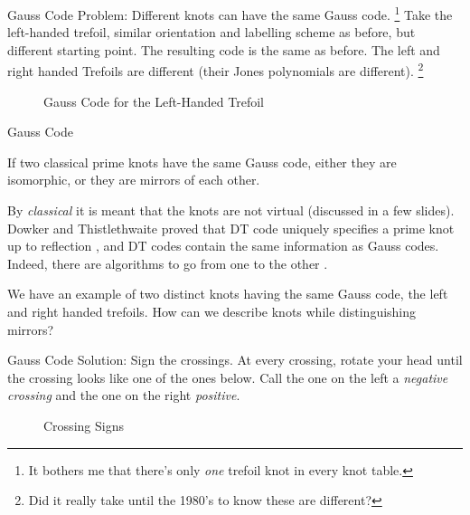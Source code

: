 \documentclass{beamer}
\begin{document}
    \begin{frame}{Gauss Code}
        Problem: Different knots can have the same Gauss code.%
        \footnote{%
            It bothers me that there's only \textit{one} trefoil knot in every
            knot table.
        }
        Take the left-handed trefoil, similar orientation and labelling scheme
        as before, but different starting point. The resulting code is the same
        as before. The left and right handed Trefoils are different
        (their Jones polynomials are different).%
        \footnote{
            Did it really take until the 1980's to know these are different?
        }
        \begin{figure}
            \centering
            \caption{Gauss Code for the Left-Handed Trefoil}
            \label{fig:left_handed_trefoil_gauss_code}
        \end{figure}
    \end{frame}
    \begin{frame}{Gauss Code}
        \begin{theorem}
            If two classical prime knots have the same Gauss code, either they
            are isomorphic, or they are mirrors of each other.
        \end{theorem}
        By \textit{classical} it is meant that the knots are not virtual
        (discussed in a few slides). Dowker and Thistlethwaite proved that DT
        code uniquely specifies a prime knot up to reflection
        \cite{DowkerThistlethwaiteDTCode}, and DT codes
        contain the same information as Gauss codes. Indeed, there are
        algorithms to go from one to the other \cite{KatlasDTCode}.
        \par\hfill\par
        We have an example of two distinct knots having the same Gauss code,
        the left and right handed trefoils. How can we describe knots while
        distinguishing mirrors?
    \end{frame}
    \begin{frame}{Gauss Code}
        Solution: Sign the crossings. At every crossing, rotate your head until
        the crossing looks like one of the ones below. Call the one on the left
        a \textit{negative crossing} and the one on the right \textit{positive}.
        \begin{figure}
            \centering
            \caption{Crossing Signs}
            \label{fig:crossing_signs}
        \end{figure}
    \end{frame}
\end{document}
